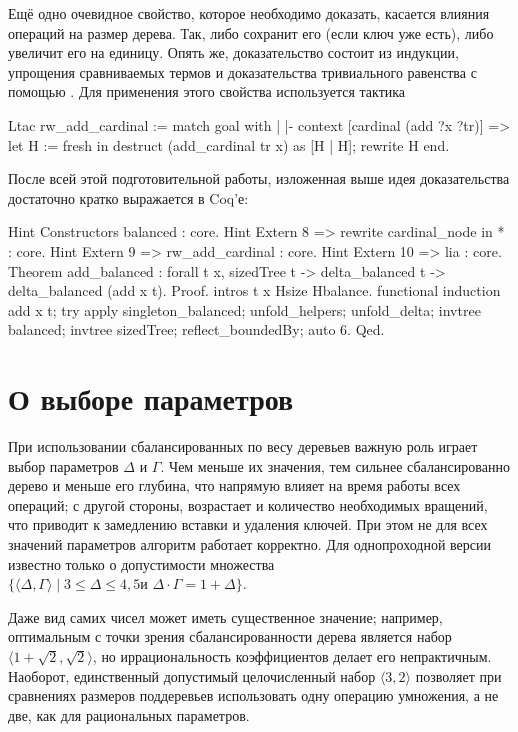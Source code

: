 \documentclass[a4paper,14pt]{extarticle}
\begin{document}
Ещё одно очевидное свойство, которое необходимо доказать,
касается влияния операций на размер дерева.
Так,  либо сохранит его
(если ключ уже есть), либо увеличит его на единицу.
Опять же, доказательство состоит из индукции,
упрощения сравниваемых термов и
доказательства тривиального равенства с помощью .
Для применения этого свойства используется тактика
\begin{coqcode}
Ltac rw_add_cardinal := match goal with
  | |- context [cardinal (add ?x ?tr)] =>
    let H := fresh in
    destruct (add_cardinal tr x) as [H | H];
    rewrite H
end.
\end{coqcode}

После всей этой подготовительной работы,
изложенная выше идея доказательства
достаточно кратко выражается в Coq'е:
\begin{coqcode}
Hint Constructors balanced : core.
Hint Extern 8 => rewrite cardinal_node in * : core.
Hint Extern 9 => rw_add_cardinal : core.
Hint Extern 10 => lia : core.
Theorem add_balanced : forall t x,
  sizedTree t -> delta_balanced t ->
  delta_balanced (add x t).
Proof.
  intros t x Hsize Hbalance.
  functional induction add x t;
  try apply singleton_balanced;
  unfold_helpers; unfold_delta;
  invtree balanced; invtree sizedTree;
  reflect_boundedBy;
  auto 6.
Qed.
\end{coqcode}

\clearpage
\section{О выборе параметров}

При использовании сбалансированных по весу деревьев
важную роль играет выбор параметров \( \Delta \) и \( \Gamma \).
Чем меньше их значения,
тем сильнее сбалансированно дерево
и меньше его глубина,
что напрямую влияет на время работы всех операций;
с другой стороны,
возрастает и количество необходимых вращений,
что приводит к замедлению вставки и удаления ключей.
При этом не для всех значений параметров
алгоритм работает корректно.
Для однопроходной версии известно только о
допустимости множества
\( \{ \langle \Delta, \Gamma \rangle \mid
\text{$3 \leqslant \Delta \leqslant 4,5$
и $\Delta \cdot \Gamma = 1 + \Delta$} \} \)\cite{lai}. 


Даже вид самих чисел может иметь существенное значение;
например, оптимальным
с точки зрения сбалансированности дерева является
набор \( \langle 1 + \sqrt{2}, \sqrt{2} \rangle \),
но иррациональность коэффициентов
делает его непрактичным\cite{roura}.
Наоборот,
единственный допустимый целочисленный набор \( \langle 3, 2 \rangle \)
позволяет при сравнениях размеров поддеревьев
использовать одну операцию умножения,
а не две, как для рациональных параметров.
\end{document}
